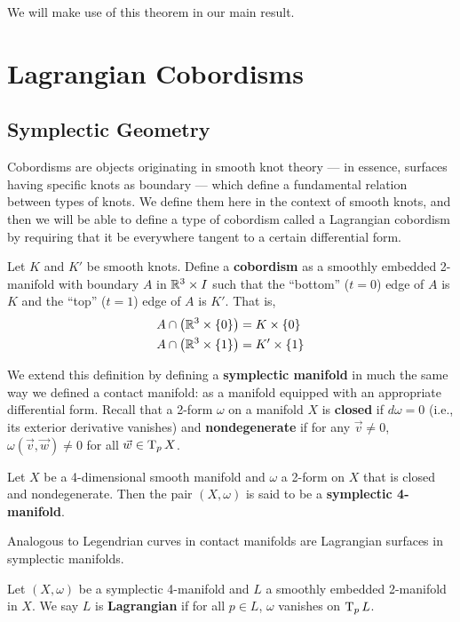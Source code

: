 We will make use of this theorem in our main result.

\section{Lagrangian Cobordisms}

\subsection{Symplectic Geometry}

Cobordisms are objects originating in smooth knot theory --- in essence, surfaces having specific knots as boundary --- which define a fundamental relation between types of knots. We define them here in the context of smooth knots, and then we will be able to define a type of cobordism called a Lagrangian cobordism by requiring that it be everywhere tangent to a certain differential form.

\begin{definition}
    Let $K$ and $K'$ be smooth knots. Define a \textbf{cobordism} as a smoothly embedded 2-manifold with boundary $A$ in $\mathbb{R}^3 \times I$ such that the ``bottom'' ($t = 0$) edge of $A$ is $K$ and the ``top'' ($t=1$) edge of $A$ is $K'$. That is,
    \begin{align*}
        A \cap \left(\mathbb{R}^3 \times \{0\}\right) &= K \times \{0\}\\
        A \cap \left(\mathbb{R}^3 \times \{1\}\right) &= K' \times \{1\}
    \end{align*}
\end{definition}

We extend this definition by defining a \textbf{symplectic manifold} in much the same way we defined a contact manifold: as a manifold equipped with an appropriate differential form. Recall that a 2-form $\omega$ on a manifold $X$ is \textbf{closed} if $d \omega = 0$ (i.e., its exterior derivative vanishes) and \textbf{nondegenerate} if for any $\vec v \neq 0$, ${\omega(\vec v, \vec w) \neq 0}$ for all ${\vec w \in \operatorname{T}_p X}$.

\begin{definition}
    Let $X$ be a 4-dimensional smooth manifold and $\omega$ a 2-form on $X$ that is closed and nondegenerate. Then the pair $(X, \omega)$ is said to be a \textbf{symplectic 4-manifold}.
\end{definition}

Analogous to Legendrian curves in contact manifolds are Lagrangian surfaces in symplectic manifolds.
\begin{definition}
    Let $(X, \omega)$ be a symplectic 4-manifold and $L$ a smoothly embedded 2-manifold in $X$. We say $L$ is \textbf{Lagrangian} if for all $p \in L$, $\omega$ vanishes on $\operatorname{T}_p L$.
\end{definition}

